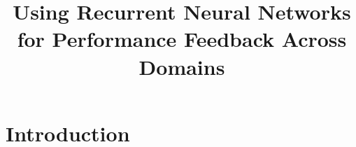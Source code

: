 \documentclass[twocolumn]{article}
\title{Using Recurrent Neural Networks for Performance Feedback Across Domains}
\begin{document}
\maketitle

\section{Introduction}
\end{document}
